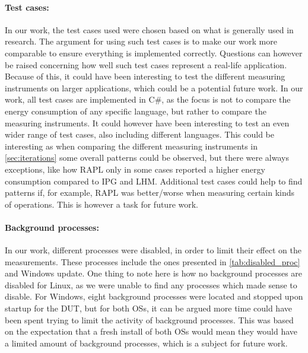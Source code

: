 \paragraph*{Test cases:} In our work, the test cases used were chosen based on what is generally used in research\cite[]{Koedijk2022diff, greenland2016statistical}. The argument for using such test cases is to make our work more comparable to ensure everything is implemented correctly. Questions can however be raised concerning how well such test cases represent a real-life application. Because of this, it could have been interesting to test the different measuring instruments on larger applications, which could be a potential future work. In our work, all test cases are implemented in C\#, as the focus is not to compare the energy consumption of any specific language, but rather to compare the measuring instruments. It could however have been interesting to test an even wider range of test cases, also including different languages. This could be interesting as when comparing the different measuring instruments in \cref{sec:iterations} some overall patterns could be observed, but there were always exceptions, like how RAPL only in some cases reported a higher energy consumption compared to IPG and LHM. Additional test cases could help to find patterns if, for example, RAPL was better/worse when measuring certain kinds of operations. This is however a task for future work.  

\paragraph*{Background processes:} In our work, different processes were disabled, in order to limit their effect on the measurements. These processes include the ones presented in \cref{tab:disabled_proc} and Windows update. One thing to note here is how no background processes are disabled for Linux, as we were unable to find any processes which made sense to disable. For Windows, eight background processes were located and stopped upon startup for the DUT, but for both OSs, it can be argued more time could have been spent trying to limit the activity of background processes. This was based on the expectation that a fresh install of both OSs would mean they would have a limited amount of background processes, which is a subject for future work. 

